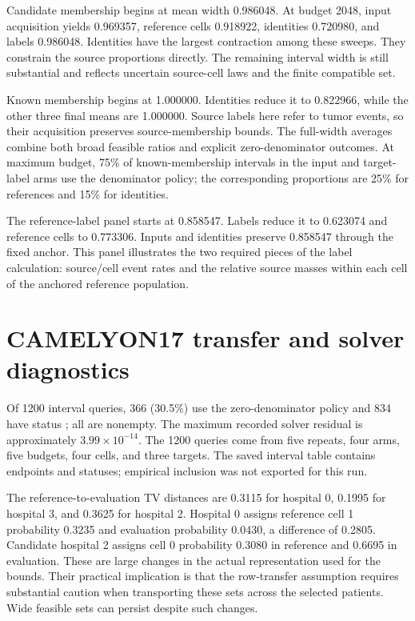 \documentclass[11pt,a4paper]{report}
\newcommand{\code}[1]{\texttt{\detokenize{#1}}}
\begin{document}
Candidate membership begins at mean width 0.986048. At budget 2048, input acquisition yields 0.969357, reference cells 0.918922, identities 0.720980, and labels 0.986048. Identities have the largest contraction among these sweeps. They constrain the source proportions directly. The remaining interval width is still substantial and reflects uncertain source-cell laws and the finite compatible set.

Known membership begins at 1.000000. Identities reduce it to 0.822966, while the other three final means are 1.000000. Source labels here refer to tumor events, so their acquisition preserves source-membership bounds. The full-width averages combine both broad feasible ratios and explicit zero-denominator outcomes. At maximum budget, 75\% of known-membership intervals in the input and target-label arms use the denominator policy; the corresponding proportions are 25\% for references and 15\% for identities.

The reference-label panel starts at 0.858547. Labels reduce it to 0.623074 and reference cells to 0.773306. Inputs and identities preserve 0.858547 through the fixed anchor. This panel illustrates the two required pieces of the label calculation: source/cell event rates and the relative source masses within each cell of the anchored reference population.

\section{CAMELYON17 transfer and solver diagnostics}
Of 1200 interval queries, 366 (30.5\%) use the zero-denominator policy and 834 have status \code{ok}; all are nonempty. The maximum recorded solver residual is approximately $3.99\times10^{-14}$. The 1200 queries come from five repeats, four arms, five budgets, four cells, and three targets. The saved interval table contains endpoints and statuses; empirical inclusion was not exported for this run.

The reference-to-evaluation TV distances are 0.3115 for hospital 0, 0.1995 for hospital 3, and 0.3625 for hospital 2. Hospital 0 assigns reference cell 1 probability 0.3235 and evaluation probability 0.0430, a difference of 0.2805. Candidate hospital 2 assigns cell 0 probability 0.3080 in reference and 0.6695 in evaluation. These are large changes in the actual representation used for the bounds. Their practical implication is that the row-transfer assumption requires substantial caution when transporting these sets across the selected patients. Wide feasible sets can persist despite such changes.
\end{document}
